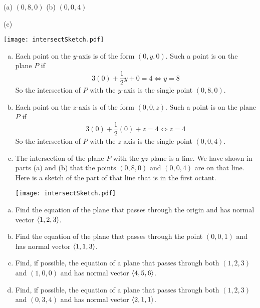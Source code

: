 \begin{answer}
(a) $(0,8,0)$ \qquad
(b) $(0,0,4)$

(c)
\begin{center}
     \texttt{[image: intersectSketch.pdf]}
\end{center}

\end{answer}

\begin{solution}
\begin{enumerate}[(a)]
\item
Each point on the $y$-axis is of the form $(0,y,0)$. Such a point is on the plane $P$ if
\begin{equation*}
3(0)+\frac{1}{2}y+0=4
\iff y=8
\end{equation*}
So the intersection of $P$ with the $y$-axis is the single point $(0,8,0)$.
\item
Each point on the $z$-axis is of the form $(0,0,z)$. Such a point is on the plane $P$ if
\begin{equation*}
3(0)+\frac{1}{2}(0)+z=4
\iff z=4
\end{equation*}
So the intersection of $P$ with the $z$-axis is the single point $(0,0,4)$.
\item
The intersection of the plane $P$ with the $yz$-plane is a line. 
We have shown in parts (a) and (b) that the points $(0,8,0)$ and $(0,0,4)$
are on that line. Here is a sketch of the part of that line that is in the first
octant.

\begin{center}
     \texttt{[image: intersectSketch.pdf]}
\end{center}
\end{enumerate}
\end{solution}

\begin{question}
\begin{enumerate}[(a)]
\item
Find the equation of the plane that passes through the origin and has normal vector $\left< 1,2,3\right>$.
\item
Find the equation of the plane that passes through the point $(0,0,1)$ and has normal vector $\left< 1,1,3\right>$.
\item
Find, if possible, the equation of a plane that passes through both $(1,2,3)$
and $(1,0,0)$ and has normal vector $\left< 4,5,6\right>$.
\item
Find, if possible, the equation of a plane that passes through both $(1,2,3)$
and $(0,3,4)$ and has normal vector $\left< 2,1,1\right>$.
\end{enumerate}
\end{question}


